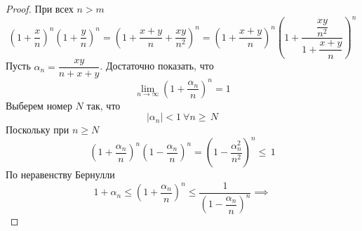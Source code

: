 \begin{proposition}
\end{proposition} \begin{proof}
    При всех $ n > m$ \begin{equation}
        \left(1 + \dfrac{x}{n}\right)^n\left(1 + \dfrac{y}{n}\right)^n = \left( 1 + \dfrac{x + y}{n} + \dfrac{xy}{n^2}  \right)^n = \left(1 + \dfrac{x + y}{n} \right)^n\left(1 + \dfrac{\dfrac{xy}{n^2} }{1 + \dfrac{x + y}{n} }\right)^ n
    \end{equation}
    Пусть $ \alpha_n = \dfrac{xy}{n + x + y}  $. Достаточно показать, что \begin{equation}
        \lim_{n \to \infty}\left(1 + \frac{\alpha_n}{n} \right)^n = 1
    \end{equation}
    Выберем номер $ N $ так, что \begin{equation}
        |\alpha_n| < 1 \:\forall n \geq\, N
    \end{equation}
    Поскольку при $ n \geq N $ \begin{equation}
        \left(1 + \frac{\alpha_n}{n} \right)^n\left(1 - \frac{\alpha_n}{n} \right)^n = \left(1 - \dfrac{\alpha_n^2}{n^2} \right)^n \leq\, 1
    \end{equation}
    По неравенству Бернулли \begin{equation}
        1 + \alpha_n  \leq \left(1 + \dfrac{\alpha_n}{n} \right)^n \leq \dfrac{1}{\left(1 - \dfrac{\alpha_n}{n}\right)^n} \implies 
    \end{equation}
    
    
\end{proof}
